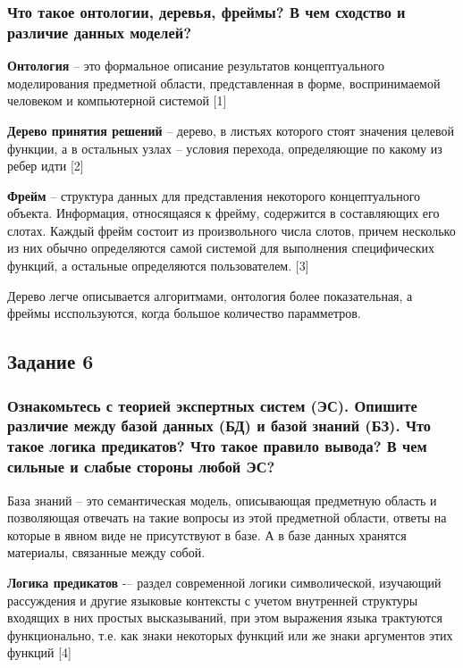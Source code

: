 \documentclass[14pt,a4paper,report]{report}
\begin{document}
\subsubsection{Что такое онтологии, деревья, фреймы? В чем сходство и различие данных моделей?}

\textbf{Онтология} -- это формальное описание результатов концептуального моделирования предметной области, представленная в форме, воспринимаемой человеком и компьютерной системой [1]

\textbf{Дерево принятия решений} -- дерево, в листьях которого стоят значения целевой функции, а в остальных узлах -- условия перехода, определяющие по какому из ребер идти [2]

\textbf{Фрейм} -- структура данных для представления некоторого концептуального объекта. Информация, относящаяся к фрейму, содержится в составляющих его слотах. Каждый фрейм состоит из произвольного числа слотов, причем несколько из них обычно определяются самой системой для выполнения специфических функций, а остальные определяются пользователем. [3]

Дерево легче описывается алгоритмами, онтология более показательная, а фреймы исспользуются, когда большое количество парамметров.

\subsection{Задание 6}

\subsubsection{Ознакомьтесь с теорией экспертных систем (ЭС). Опишите различие между базой данных (БД) и базой знаний (БЗ). Что такое логика предикатов? Что такое правило вывода? В чем сильные и слабые стороны любой ЭС?}

База знаний -- это семантическая модель, описывающая предметную область и позволяющая отвечать на такие вопросы из этой предметной области, ответы на которые в явном виде не присутствуют в базе. А в базе данных хранятся материалы, связанные между собой. 

\textbf{Логика предикатов} -– раздел современной логики символической, изучающий рассуждения и другие языковые контексты с учетом внутренней структуры входящих в них простых высказываний, при этом выражения языка трактуются функционально, т.е. как знаки некоторых функций или же знаки аргументов этих функций [4]
\end{document}
